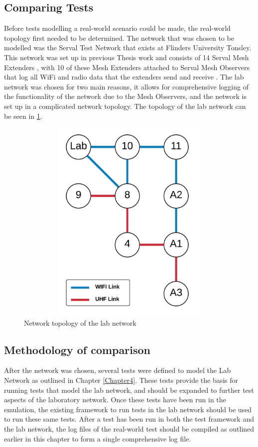 \subsection{Comparing Tests}
Before tests modelling a real-world scenario could be made, the real-world topology first needed to be determined.
The network that was chosen to be modelled was the Serval Test Network that exists at Flinders University Tonsley.
This network was set up in previous Thesis work and consists of 14 Serval Mesh Extenders \parencite{wade_2019}, with 10 of these Mesh Extenders attached to Serval Mesh Observers that log all WiFi and radio data that the extenders send and receive \parencite{lancaster_2019}.
The lab network was chosen for two main reasons, it allows for comprehensive logging of the functionality of the network due to the Mesh Observers, and the network is set up in a complicated network topology.
The topology of the lab network can be seen in \figurename{ \ref{fig:chapter6LabNetwork}}.

\begin{figure}[h]
    \begin{centering}
        \includegraphics[width=15cm,height=10cm,keepaspectratio]{Figures/Chapter6-LabTopology.png}
        \caption{Network topology of the lab network}
        \label{fig:chapter6LabNetwork}
    \end{centering}
\end{figure}


\subsection{Methodology of comparison}
After the network was chosen, several tests were defined to model the Lab Network as outlined in Chapter \ref{Chapter4}.
These tests provide the basis for running tests that model the lab network, and should be expanded to further test aspects of the laboratory network.
Once these tests have been run in the emulation, the existing framework to run tests in the lab network should be used to run these same tests.
After a test has been run in both the test framework and the lab network, the log files of the real-world test should be compiled as outlined earlier in this chapter to form a single comprehensive log file.

